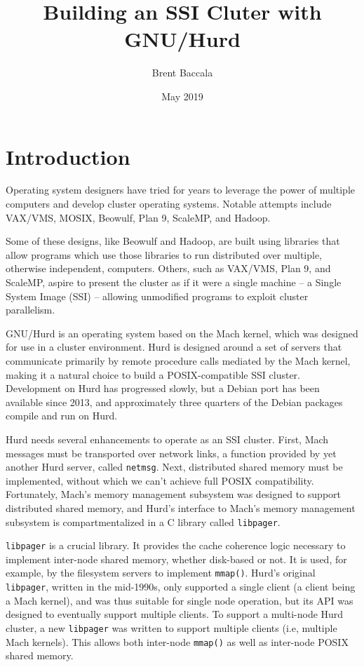 \documentclass{article}
\title{Building an SSI Cluter with GNU/Hurd}
\author{Brent Baccala}
\date{May 2019}
\def\libpager{{\tt libpager}\xspace}
\def\netmsg{{\tt netmsg}\xspace}
\begin{document}
\maketitle

\tableofcontents

\vfill\eject

\section{Introduction}

Operating system designers have tried for years to leverage the power
of multiple computers and develop cluster operating systems.  Notable
attempts include VAX/VMS, MOSIX, Beowulf, Plan 9, ScaleMP, and Hadoop.

Some of these designs, like Beowulf and Hadoop, are built using
libraries that allow programs which use those libraries to run
distributed over multiple, otherwise independent, computers.  Others,
such as VAX/VMS, Plan 9, and ScaleMP, aspire to present the cluster as
if it were a single machine -- a Single System Image (SSI) -- allowing
unmodified programs to exploit cluster parallelism.

GNU/Hurd is an operating system based on the Mach kernel, which was
designed for use in a cluster environment.  Hurd is designed around a
set of servers that communicate primarily by remote procedure calls
mediated by the Mach kernel, making it a natural choice to build a
POSIX-compatible SSI cluster.  Development on Hurd has progressed
slowly, but a Debian port has been available since 2013, and
approximately three quarters of the Debian packages compile and run on
Hurd.

Hurd needs several enhancements to operate as an SSI cluster.  First,
Mach messages must be transported over network links, a function
provided by yet another Hurd server, called \netmsg.  Next,
distributed shared memory must be implemented, without which we can't
achieve full POSIX compatibility.  Fortunately, Mach's memory
management subsystem was designed to support distributed shared
memory, and Hurd's interface to Mach's memory management subsystem
is compartmentalized in a C library called \libpager.

\libpager is a crucial library.  It provides the cache coherence logic
necessary to implement inter-node shared memory, whether disk-based or
not.  It is used, for example, by the filesystem servers to implement
{\tt mmap()}.  Hurd's original \libpager, written in the mid-1990s,
only supported a single client (a client being a Mach kernel), and was
thus suitable for single node operation, but its API was designed to
eventually support multiple clients.  To support a multi-node Hurd
cluster, a new \libpager was written to support multiple clients (i.e,
multiple Mach kernels).  This allows both inter-node {\tt mmap()}
as well as inter-node POSIX shared memory.
\end{document}
